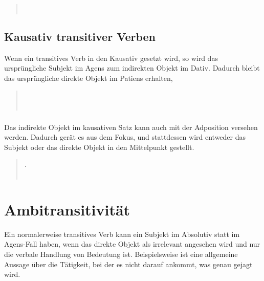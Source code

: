 \begin{quotation}
	\noindent{} \\
	\noindent{} 
\end{quotation}

\subsection{Kausativ transitiver Verben} Wenn ein transitives Verb in den Kausativ gesetzt wird, so wird das ursprüngliche Subjekt im Agens zum indirekten Objekt im Dativ. Dadurch bleibt das ursprüngliche direkte Objekt im Patiens erhalten,  \label{syn:trans-causative}

\begin{quotation}
	\noindent{} \\
	\noindent{}\\
	\indent {} 
\end{quotation}

\subsubsection{} Das indirekte Objekt im kausativen Satz kann auch mit der Adposition   versehen werden. Dadurch gerät es aus dem Fokus, und stattdessen wird entweder das Subjekt oder das direkte Objekt in den Mittelpunkt gestellt. 

\begin{quotation}
	\noindent{} .\\
	\noindent{} \\
	\indent {}
\end{quotation}

\section{Ambitransitivität}
\noindent Ein normalerweise transitives Verb kann ein Subjekt im Absolutiv statt im Agens-Fall haben, wenn das direkte Objekt als irrelevant angesehen wird und nur die verbale Handlung von Bedeutung ist. Beispielsweise ist   eine allgemeine Aussage über die Tätigkeit, bei der es nicht darauf ankommt, was genau gejagt wird.  

